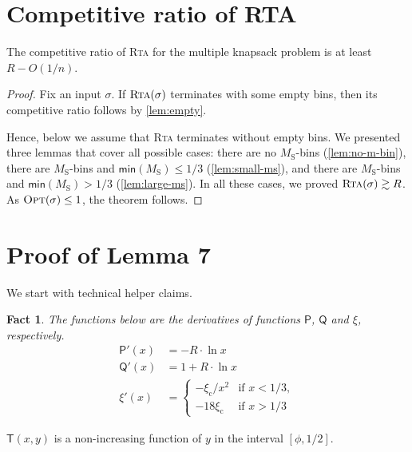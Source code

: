 \documentclass[a4paper,USenglish,cleveref]{lipics-v2019}
\newtheorem{fact}[theorem]{Fact}
\newcommand{\R}{\ensuremath{R}}
\newcommand{\M}{\ensuremath{M_\mathrm{S}}\xspace}
\newcommand{\smallBoundary}{\ensuremath{\phi}}
\newcommand{\gconst}{\ensuremath{\xi_\mathrm{c}}}
\newcommand{\g}{\ensuremath{\xi}}
\newcommand{\water}{\textsf{Q}}
\newcommand{\cutintegral}{\textsf{P}}
\newcommand{\mn}{\textsf{min}}
\newcommand{\T}{\textsf{T}}
\newcommand{\ALG}{\textsc{Rta}\xspace}
\newcommand{\OPT}{\textsc{Opt}\xspace}
\begin{document}
\section{Competitive ratio of RTA}
\label{sec:final}

\begin{theorem}
The competitive ratio of \ALG for the multiple knapsack problem is at least $\R-O(1/n)$. 
\end{theorem}
  
\begin{proof}
Fix an input $\sigma$. If $\ALG(\sigma)$ terminates 
with some empty bins, then its competitive ratio
follows by \cref{lem:empty}.

Hence, below we assume that \ALG terminates without empty bins.
We presented three lemmas that cover all possible cases:
there are no \M-bins (\cref{lem:no-m-bin}),
there are \M-bins and $\mn(\M) \leq 1/3$ (\cref{lem:small-ms}),
and there are \M-bins and $\mn(\M) > 1/3$ (\cref{lem:large-ms}).
In all these cases, we proved $\ALG(\sigma) \gtrsim \R$.
As $\OPT(\sigma)  \leq 1$, the theorem follows.
\end{proof}  



\section{Proof of Lemma 7}
\label{sec:proofs}

We start with technical helper claims.

\begin{fact}
  The functions below are the derivatives of functions $\cutintegral$, $\water$ and $\g$, respectively.
  \begin{align*}
    \cutintegral'(x) & =  -\R \cdot \ln x \\
    \water'(x) & =  1+\R\cdot \ln x \\
    \g'(x) & =
    \begin{cases}
      -\gconst / x^2 & \text{if $x < 1/3$} , \\
      -18 \gconst & \text{if $x > 1/3$}
    \end{cases}
  \end{align*}
  \end{fact}
  
  
  \begin{lemma}
  \label{lem:T-non-increasing}
  $\T(x,y)$ is a non-increasing function of $y$ in the interval $[\smallBoundary,1/2]$.
  \end{lemma}
  
\end{document}
